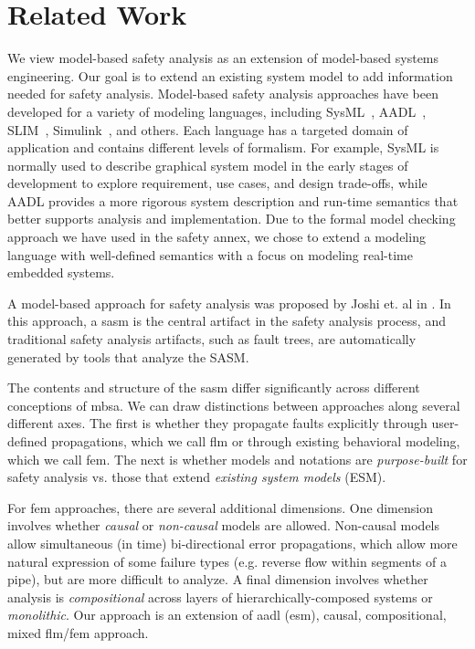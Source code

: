 \section{Related Work}
\label{sec:related_work}

We view model-based safety analysis as an extension of model-based systems engineering. Our 
goal is to extend an existing system model to add information needed for safety analysis.
Model-based safety analysis approaches have been developed for a variety of modeling languages, 
including SysML~\cite{friedenthal2014practical, helle2012automatic,mhenni2014automatic}, AADL~\cite{AADL_Standard, EMV2}, SLIM~\cite{10.1007/978-3-642-04468-7_15}, Simulink~\cite{MathWorks, Joshi05:SafeComp}, and others. 
Each language has a targeted domain of application and contains different levels of formalism.
For example, SysML is normally used to describe graphical system model in the early stages of 
development to explore requirement, use cases, and design trade-offs, while AADL provides a 
more rigorous system description and run-time semantics that better supports analysis and 
implementation.  Due to the formal model checking approach we have used in the safety annex, 
we chose to extend a modeling language with well-defined semantics with a focus on modeling 
real-time embedded systems.

A model-based approach for safety analysis was proposed by Joshi et. al in \cite{Joshi05:Dasc, Joshi05:SafeComp, Joshi07:Hase}.  In this approach, a \gls{sasm} is the central artifact in the safety analysis process, and traditional safety analysis artifacts, such as fault trees, are automatically generated by tools that analyze the SASM.

The contents and structure of the \gls{sasm} differ significantly across different conceptions of \gls{mbsa}.  We can draw distinctions between approaches along several different axes.  The first is whether they propagate faults explicitly through user-defined propagations, which we call \gls{flm} or through existing behavioral modeling, which we call \gls{fem}.  The next is whether models and notations are {\em purpose-built} for safety analysis vs. those that extend {\em existing system models} (ESM).

For \gls{fem} approaches, there are several additional dimensions.  One dimension involves whether {\em causal} or {\em non-causal} models are allowed.  Non-causal models allow simultaneous (in time) bi-directional %
error propagations, which allow more natural expression of some failure types (e.g. reverse flow within segments of a pipe), but are more difficult to analyze.  A final dimension involves whether analysis is {\em compositional} across layers of hierarchically-composed systems or {\em monolithic}.  Our approach is an extension of \gls{aadl} (\gls{esm}), causal, compositional, mixed \gls{flm}/\gls{fem} approach.

